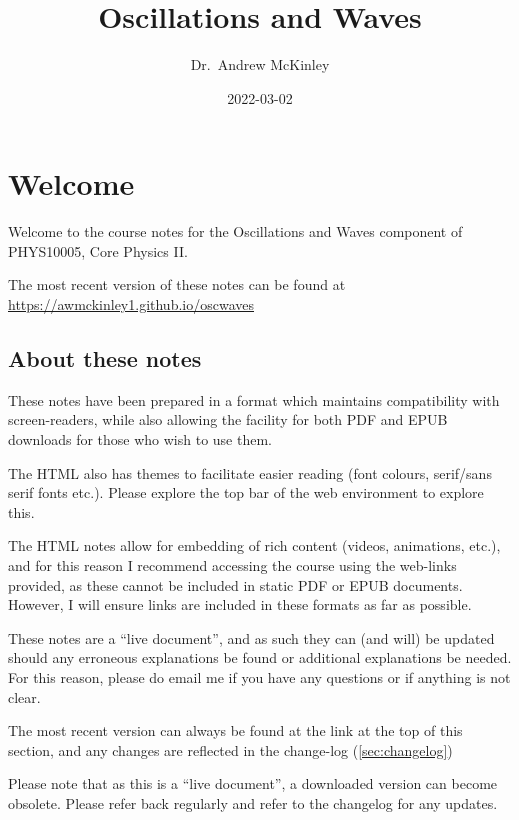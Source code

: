 \documentclass[
]{book}
\title{Oscillations and Waves}
\author{Dr.~Andrew McKinley}
\date{2022-03-02}
\begin{document}
\maketitle

{
\setcounter{tocdepth}{1}
\tableofcontents
}
\hypertarget{welcome}{%
\chapter*{Welcome}\label{welcome}}

Welcome to the course notes for the Oscillations and Waves component of PHYS10005, Core Physics II.

The most recent version of these notes can be found at \url{https://awmckinley1.github.io/oscwaves}

\hypertarget{about-these-notes}{%
\section*{About these notes}\label{about-these-notes}}

These notes have been prepared in a format which maintains compatibility with screen-readers, while also allowing the facility for both PDF and EPUB downloads for those who wish to use them.

The HTML also has themes to facilitate easier reading (font colours, serif/sans serif fonts etc.). Please explore the top bar of the web environment to explore this.

The HTML notes allow for embedding of rich content (videos, animations, etc.), and for this reason I recommend accessing the course using the web-links provided, as these cannot be included in static PDF or EPUB documents. However, I will ensure links are included in these formats as far as possible.

These notes are a ``live document'', and as such they can (and will) be updated should any erroneous explanations be found or additional explanations be needed. For this reason, please do email me if you have any questions or if anything is not clear.

The most recent version can always be found at the link at the top of this section, and any changes are reflected in the change-log (\ref{sec:changelog})

Please note that as this is a ``live document'', a downloaded version can become obsolete. Please refer back regularly and refer to the changelog for any updates.
\end{document}

